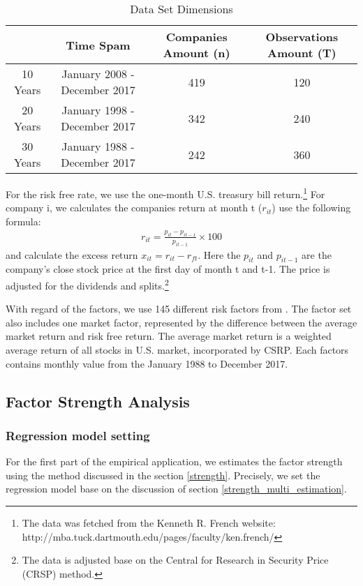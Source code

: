 \begin{table}[h]
		\caption{Data Set Dimensions}
			\label{Data_set}
	\begin{tabular}{c|ccc}
		\hline
		& Time Spam                    & Companies Amount (n) & Observations Amount (T) \\ \hline
		10 Years & January 2008 - December 2017 & 419                  & 120                     \\
		20 Years & January 1998 - December 2017 & 342                  & 240                     \\
		30 Years & January 1988 - December 2017 & 242                  & 360                     \\ \hline
	\end{tabular}
\end{table}
For the risk free rate, we use the one-month U.S. treasury bill return.\footnote{ The data was fetched from the Kenneth R. French website: http://mba.tuck.dartmouth.edu/pages/faculty/ken.french/}
For company i, we calculates the companies return at month t ($r_{it}$) use the following formula:
\begin{align*}
r_{it} = \frac{p_{i t} - p_{i t-1}}{p_{i t-1}}\times 100
\end{align*}
and calculate the excess return $x_{it} = r_{it} - r_{ft}$.
Here the $p_{it}$ and $p_{i t-1}$ are the company's close stock price at the first day of month t and t-1.
The price is adjusted for the dividends and splits.\footnote{The data is adjusted base on the Central for Research in Security Price (CRSP) method.}

With regard of the factors, we use 145 different risk factors from .
The factor set also includes one market factor, represented by the difference between the average market return and risk free return.
The average market return is a weighted average return of all stocks in U.S. market, incorporated by CSRP.
Each factors contains monthly value from the January 1988 to December 2017.

\subsection{Factor Strength Analysis}

\subsubsection{Regression model setting}
For the first part of the empirical application, we estimates the factor strength using the method discussed in the section \ref{strength}.
Precisely, we set the regression model base on the discussion of section \ref{strength_multi_estimation}.

